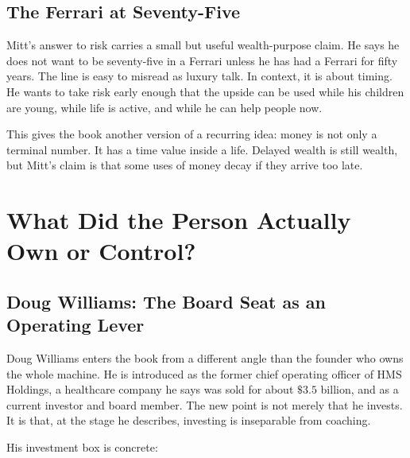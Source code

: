 \documentclass[11pt,oneside]{book}
\begin{document}
\section{The Ferrari at Seventy-Five}

Mitt's answer to risk carries a small but useful wealth-purpose claim. He says he does not want to be seventy-five in a Ferrari unless he has had a Ferrari for fifty years. The line is easy to misread as luxury talk. In context, it is about timing. He wants to take risk early enough that the upside can be used while his children are young, while life is active, and while he can help people now.

This gives the book another version of a recurring idea: money is not only a terminal number. It has a time value inside a life. Delayed wealth is still wealth, but Mitt's claim is that some uses of money decay if they arrive too late.


\chapter{What Did the Person Actually Own or Control?}

\section{Doug Williams: The Board Seat as an Operating Lever}

Doug Williams enters the book from a different angle than the founder who owns the whole machine. He is introduced as the former chief operating officer of HMS Holdings, a healthcare company he says was sold for about \(\$3.5\) billion, and as a current investor and board member. The new point is not merely that he invests. It is that, at the stage he describes, investing is inseparable from coaching.

His investment box is concrete:
\end{document}

